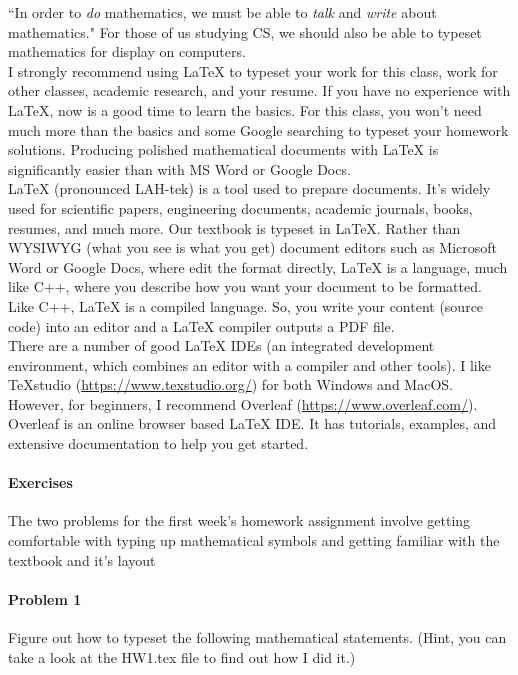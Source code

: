 \documentclass[11pt]{article} %
\begin{document}
	``In order to \textit{do} mathematics, we must be able to \textit{talk} and \textit{write} about mathematics." For those of us studying CS, we should also be able to typeset mathematics for display on computers.\\
	
	I strongly recommend using \LaTeX{} to typeset your work for this class, work for other classes, academic research, and your resume. If you have no experience with \LaTeX{}, now is a good time to learn the basics. For this class, you won't need much more than the basics and some Google searching to typeset your homework solutions. Producing polished mathematical documents with \LaTeX{} is significantly easier than with MS Word or Google Docs.\\
	
	\LaTeX{} (pronounced LAH-tek) is a tool used to prepare documents. It's widely used for scientific papers, engineering documents, academic journals, books, resumes, and much more. Our textbook is typeset in \LaTeX{}. Rather than WYSIWYG (what you see is what you get) document editors such as Microsoft Word or Google Docs, where edit the format directly, \LaTeX{} is a language, much like C++, where you describe how you want your document to be formatted. Like C++, \LaTeX{} is a compiled language. So, you write your content (source code) into an editor and a \LaTeX{} compiler outputs a PDF file. \\
	
	There are a number of good \LaTeX{} IDEs (an integrated development environment, which combines an editor with a compiler and other tools). I like TeXstudio (\url{https://www.texstudio.org/}) for both Windows and MacOS. However, for beginners, I recommend Overleaf (\url{https://www.overleaf.com/}). Overleaf is an online browser based \LaTeX{} IDE. It has tutorials, examples, and extensive documentation to help you get started. 
	
	\newpage
	
	\paragraph{Exercises} The two problems for the first week's homework assignment involve getting comfortable with typing up mathematical symbols and getting familiar with the textbook and it's layout
	

	\paragraph{Problem 1} Figure out how to typeset the following mathematical statements. (Hint, you can take a look at the HW1.tex file to find out how I did it.)
	
\end{document}
